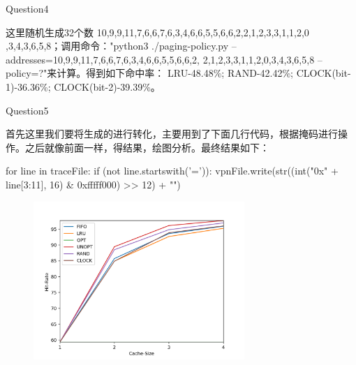 \documentclass[12pt]{article}
\begin{document}
\begin{large}
	\noindent Question4\\
\end{large}
\hspace*{2em}这里随机生成32个数 10,9,9,11,7,6,6,7,6,3,4,6,6,5,5,6,6,2,2,1,2,3,3,1,1,2,0
,3,4,3,6,5,8；调用命令："python3 ./paging-policy.py --addresses=10,9,9,11,7,6,6,7,6,3,4,6,6,5,5,6,6,2,
2,1,2,3,3,1,1,2,0,3,4,3,6,5,8 --policy=?"来计算。得到如下命中率：
LRU-48.48\%; RAND-42.42\%; CLOCK(bit-1)-36.36\%; CLOCK(bit-2)-39.39\%。\\

\begin{large}
	\noindent Question5\\
\end{large}
\hspace*{2em}首先这里我们要将生成的进行转化，主要用到了下面几行代码，根据掩码进行操作。之后就像前面一样，得结果，绘图分析。最终结果如下：
\begin{python}
for line in traceFile:
    if (not line.startswith('=')):
        vpnFile.write(str((int("0x" + line[3:11], 16) & 0xfffff000) >> 12) + "\n")
\end{python}
\begin{figure}[h]
    \centering
    \includegraphics[width=8cm,height=6cm]{workload.png}
\end{figure}
\end{document}
